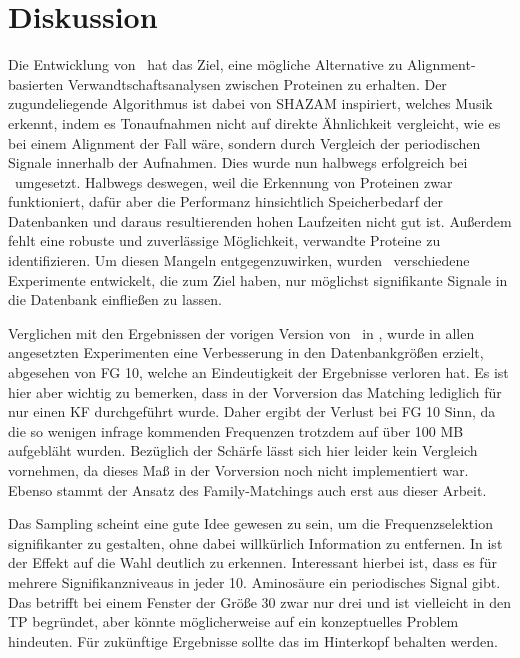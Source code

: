 \section{Diskussion} %
    \label{sec:diskussion}
    Die Entwicklung von \protfin\ hat das Ziel, eine mögliche Alternative zu Alignment-basierten Verwandtschaftsanalysen zwischen Proteinen zu erhalten. Der zugundeliegende Algorithmus ist dabei von SHAZAM inspiriert, welches Musik erkennt, indem es Tonaufnahmen nicht auf direkte Ähnlichkeit vergleicht, wie es bei einem Alignment der Fall wäre, sondern durch Vergleich der periodischen Signale innerhalb der Aufnahmen. Dies wurde nun halbwegs erfolgreich bei \protfin\ umgesetzt. Halbwegs deswegen, weil die Erkennung von Proteinen zwar funktioniert, dafür aber die Performanz hinsichtlich Speicherbedarf der Datenbanken und daraus resultierenden hohen Laufzeiten nicht gut ist. Außerdem fehlt eine robuste und zuverlässige Möglichkeit, verwandte Proteine zu identifizieren. Um diesen Mangeln entgegenzuwirken, wurden \theexperiment\ verschiedene Experimente entwickelt, die zum Ziel haben, nur möglichst signifikante Signale in die Datenbank einfließen zu lassen.

    Verglichen mit den Ergebnissen der vorigen Version von \protfin\ in , wurde in allen angesetzten Experimenten eine Verbesserung in den Datenbankgrößen erzielt, abgesehen von \acf{FG} 10, welche an Eindeutigkeit der Ergebnisse verloren hat. Es ist hier aber wichtig zu bemerken, dass in der Vorversion das Matching lediglich für nur einen \acf{KF} durchgeführt wurde. Daher ergibt der Verlust bei \ac{FG} 10 Sinn, da die so wenigen infrage kommenden Frequenzen trotzdem auf über 100 \acs{MB} aufgebläht wurden. Bezüglich der Schärfe lässt sich hier leider kein Vergleich vornehmen, da dieses Maß in der Vorversion noch nicht implementiert war. Ebenso stammt der Ansatz des Family-Matchings auch erst aus dieser Arbeit.

    Das Sampling scheint eine gute Idee gewesen zu sein, um die Frequenzselektion signifikanter zu gestalten, ohne dabei willkürlich Information zu entfernen. In  ist der Effekt auf die Wahl deutlich zu erkennen. Interessant hierbei ist, dass es für mehrere Signifikanzniveaus in jeder 10. Aminosäure ein periodisches Signal gibt. Das betrifft bei einem Fenster der Größe 30 zwar nur drei und ist vielleicht in den \acf{TP} begründet, aber könnte möglicherweise auf ein konzeptuelles Problem hindeuten. Für zukünftige Ergebnisse sollte das im Hinterkopf behalten werden.

